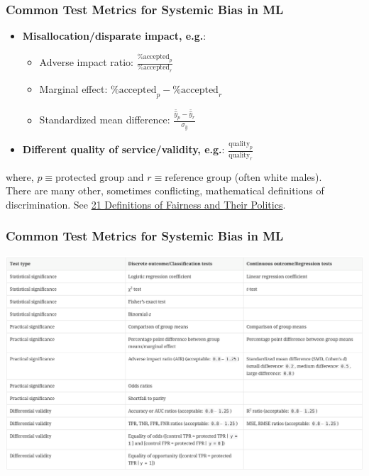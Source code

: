 \documentclass[11pt,aspectratio=169,hyperref={colorlinks}]{beamer}
\begin{document}
		\begin{frame}				
		
			\frametitle{Common Test Metrics for Systemic Bias in ML}
			
			\begin{itemize}
				\item \textbf{Misallocation/disparate impact, e.g.}:			
						\begin{itemize}\small
							\item Adverse impact ratio: $\frac{\text{\% accepted}_p }{ \text{\% accepted}_r}$ 
							\item Marginal effect: $\text{\% accepted}_p - \text{\% accepted}_r$
							\item Standardized mean difference: $\frac{\bar{\hat{y}}_p - \bar{\hat{y}}_r}{\sigma_{\hat{y}}}$
						\end{itemize}
				\item \textbf{Different quality of service/validity, e.g.}: $\frac{\text{quality}_p}{\text{quality}_r}$
			\end{itemize}
			\noindent 
			\scriptsize{where, $p \equiv \text{protected group}$ and $r \equiv \text{reference group}$ (often white males).}\\
			\vspace{5pt}
			\normalsize{There are many other, sometimes conflicting, mathematical definitions of discrimination. 
				See \href{https://www.youtube.com/watch?v=wqamrPkF5kk}{21 Definitions of Fairness and Their Politics}.}
			
		\end{frame}
		
		\begin{frame}				
		
			\frametitle{Common Test Metrics for Systemic Bias in ML}
			
			\centering
			\includegraphics[scale=0.13]{../img/bias_metrics.png}
			
		\end{frame}		
		
\end{document}
